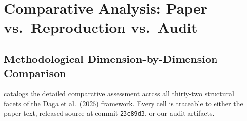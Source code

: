 \section{Comparative Analysis: Paper vs.\ Reproduction vs.\ Audit}
\label{sec:comparison-matrix}

\subsection{Methodological Dimension-by-Dimension Comparison}
 catalogs the detailed comparative assessment across all thirty-two structural facets of the Daga et al.\ (2026) framework. Every cell is traceable to either the paper text, released source at commit \texttt{23c89d3}, or our audit artifacts.

